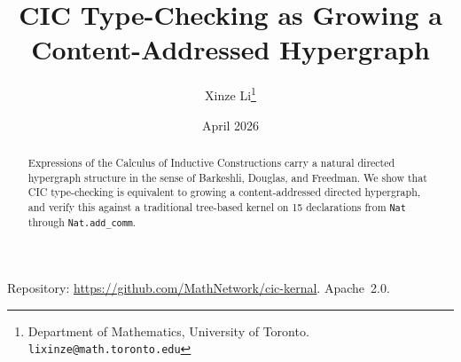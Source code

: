\documentclass[11pt]{article}
\title{CIC Type-Checking as Growing a Content-Addressed Hypergraph}
\author{
  Xinze Li\thanks{Department of Mathematics, University of Toronto. \texttt{lixinze@math.toronto.edu}}
}
\date{April 2026}
\begin{document}
\maketitle

\begin{abstract}
Expressions of the Calculus of Inductive Constructions carry a natural directed hypergraph structure in the sense of Barkeshli, Douglas, and Freedman.  We show that CIC type-checking is equivalent to growing a content-addressed directed hypergraph, and verify this against a traditional tree-based kernel on 15 declarations from \texttt{Nat} through \texttt{Nat.add\_comm}.
\end{abstract}

\vspace{2pt}
{\small\noindent Repository: \url{https://github.com/MathNetwork/cic-kernal}. Apache~2.0.}

{\small\tableofcontents}
\newpage









\appendix

\end{document}
